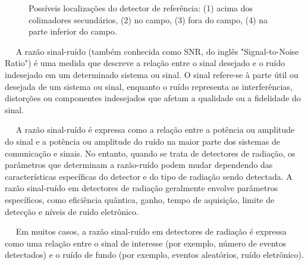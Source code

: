 \documentclass[11pt,a4paper]{article}
\newcounter{exemplo}
\begin{document}
	\begin{figure}[h]
		\centering
		\caption{Possíveis localizações do detector de referência: (1) acima dos colimadores secundários, (2) no campo, (3) fora do campo, (4) na parte inferior do campo.}
		\label{fig:posicaoDetector}
	\end{figure}

	\begin{tcolorbox}[width=\textwidth, colback={white}, colbacktitle={DarkTurquoise!50!white}, title={$\bigstar$ \LobsterTwo{Nota: Razão Sinal-Ruído} $\bigstar $}, coltitle={CarnationPink}, colframe={DarkTurquoise}, fonttitle=\rmfamily\bfseries\Large]
		$\quad$ A razão sinal-ruído (também conhecida como SNR, do inglês "Signal-to-Noise Ratio") é uma medida que descreve a relação entre o sinal desejado e o ruído indesejado em um determinado sistema ou sinal. O sinal refere-se à parte útil ou desejada de um sistema ou sinal, enquanto o ruído representa as interferências, distorções ou componentes indesejados que afetam a qualidade ou a fidelidade do sinal.

		$\quad$ A razão sinal-ruído é expressa como a relação entre a potência ou amplitude do sinal e a potência ou amplitude do ruído na maior parte dos sistemas de comunicação e sinais. No entanto, quando se trata de detectores de radiação, os parâmetros que determinam a razão-ruído podem mudar dependendo das características específicas do detector e do tipo de radiação sendo detectada. A razão sinal-ruído em detectores de radiação geralmente envolve parâmetros específicos, como eficiência quântica, ganho, tempo de aquisição, limite de detecção e níveis de ruído eletrônico. 

		$\quad$ Em muitos casos, a razão sinal-ruído em detectores de radiação é expressa como uma relação entre o sinal de interesse (por exemplo, número de eventos detectados) e o ruído de fundo (por exemplo, eventos aleatórios, ruído eletrônico).
	\end{tcolorbox}
\end{document}
